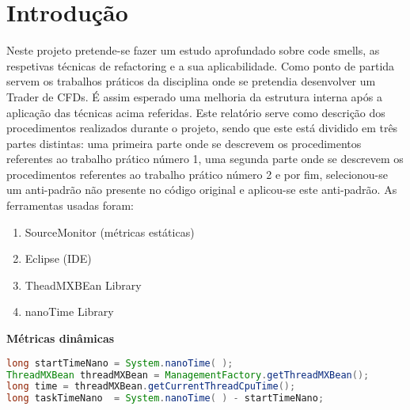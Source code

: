 \section{Introdução}\label{sec:Introduction}

Neste projeto pretende-se fazer um estudo aprofundado sobre code smells, as respetivas técnicas de refactoring e a sua aplicabilidade. Como ponto de partida servem os trabalhos práticos da disciplina onde se pretendia desenvolver um Trader de CFDs. É assim esperado uma melhoria da estrutura interna após a aplicação das técnicas acima referidas.
Este relatório serve como descrição dos procedimentos realizados durante o projeto, sendo que este está dividido em três partes distintas: uma primeira parte onde se descrevem os procedimentos referentes ao trabalho prático número 1, uma segunda parte onde se descrevem os procedimentos referentes ao trabalho prático número 2 e por fim, selecionou-se um anti-padrão não presente no código original e aplicou-se este anti-padrão.
\vspace{5mm}
\newline As ferramentas usadas foram:

\begin{enumerate}
    \item SourceMonitor (métricas estáticas)
    \item Eclipse (IDE)
    \item TheadMXBEan Library
    \item nanoTime Library
\end{enumerate}
\vspace{5mm}
\textbf{Métricas dinâmicas}
\begin{lstlisting}[breaklines,frame=single,language=java]
long startTimeNano = System.nanoTime( );
ThreadMXBean threadMXBean = ManagementFactory.getThreadMXBean();
long time = threadMXBean.getCurrentThreadCpuTime();
long taskTimeNano  = System.nanoTime( ) - startTimeNano; 
\end{lstlisting}